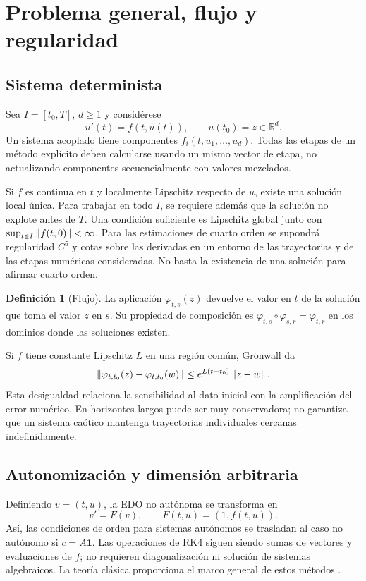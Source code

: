 \documentclass[11pt,a4paper]{article}
\theoremstyle{definition}\newtheorem{definition}[theorem]{Definición}
\theoremstyle{remark}\newtheorem{remark}[theorem]{Observación}
\newcommand{\R}{\mathbb R}\newcommand{\E}{\mathbb E}
\begin{document}
\clearpage
\section{Problema general, flujo y regularidad}
\subsection{Sistema determinista}
Sea $I=[t_0,T]$, $d\geq1$ y considérese
\begin{equation}\label{eq:ivp}
 u'(t)=f(t,u(t)),\qquad u(t_0)=z\in\R^d.
\end{equation}
Un sistema acoplado tiene componentes $f_i(t,u_1,\ldots,u_d)$. Todas las
etapas de un método explícito deben calcularse usando un mismo vector de
etapa, no actualizando componentes secuencialmente con valores mezclados.

Si $f$ es continua en $t$ y localmente Lipschitz respecto de $u$, existe una
solución local única. Para trabajar en todo $I$, se requiere además que la
solución no explote antes de $T$. Una condición suficiente es Lipschitz
global junto con $\sup_{t\in I}\left\lVert f(t,0)\right\rVert<\infty$. Para las estimaciones de
cuarto orden se supondrá regularidad $C^5$ y cotas sobre las derivadas en un
entorno de las trayectorias y de las etapas numéricas consideradas. No basta
la existencia de una solución para afirmar cuarto orden.

\begin{definition}[Flujo]
La aplicación $\varphi_{t,s}(z)$ devuelve el valor en $t$ de la solución que
toma el valor $z$ en $s$. Su propiedad de composición es
$\varphi_{t,s}\circ\varphi_{s,r}=\varphi_{t,r}$ en los dominios donde las
soluciones existen.
\end{definition}
Si $f$ tiene constante Lipschitz $L$ en una región común, Grönwall da
\begin{equation}\label{eq:flow}
 \left\lVert\varphi_{t,t_0}(z)-\varphi_{t,t_0}(w)\right\rVert
 \leq e^{L(t-t_0)}\left\lVert z-w\right\rVert.
\end{equation}
Esta desigualdad relaciona la sensibilidad al dato inicial con la
amplificación del error numérico. En horizontes largos puede ser muy
conservadora; no garantiza que un sistema caótico mantenga trayectorias
individuales cercanas indefinidamente.

\subsection{Autonomización y dimensión arbitraria}
Definiendo $v=(t,u)$, la EDO no autónoma se transforma en
\[
 v'=F(v),\qquad F(t,u)=(1,f(t,u)).
\]
Así, las condiciones de orden para sistemas autónomos se trasladan al caso
no autónomo si $c=A\mathbf1$. Las operaciones de RK4 siguen siendo sumas de
vectores y evaluaciones de $f$; no requieren diagonalización ni solución de
sistemas algebraicos. La teoría clásica proporciona el marco general de
estos métodos \cite{hairer}.
\end{document}
